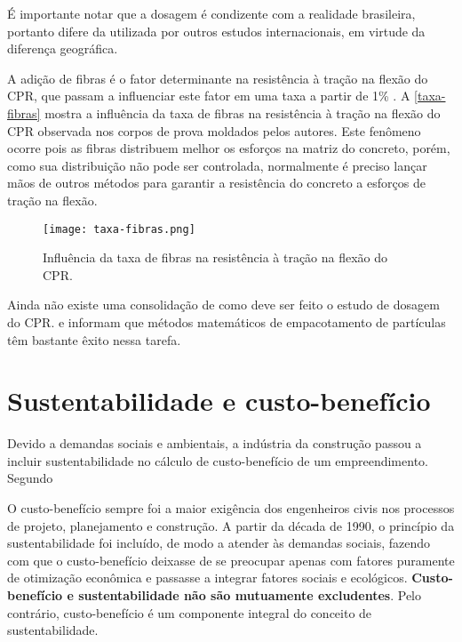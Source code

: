 É importante notar que a dosagem  é condizente com a realidade brasileira, portanto difere da utilizada por outros estudos internacionais, em virtude da diferença geográfica.

A adição de fibras é o fator determinante na resistência à tração na flexão do CPR, que passam a influenciar este fator em uma taxa a partir de 1\% \cite[p.~138]{Vanderlei_e_Giongo}. A \autoref{taxa-fibras} mostra a influência da taxa de fibras na resistência à tração na flexão do CPR observada nos corpos de prova moldados pelos autores. Este fenômeno ocorre pois as fibras distribuem melhor os esforços na matriz do concreto, porém, como sua distribuição não pode ser controlada, normalmente é preciso lançar mãos de outros métodos para garantir a resistência do concreto a esforços de tração na flexão.

\begin{figure}[htb]
	\caption{\label{taxa-fibras}Influência da taxa de fibras na resistência à tração na flexão do CPR.}
	\begin{center}
	    \texttt{[image: taxa-fibras.png]}
	\end{center}
\end{figure}

Ainda não existe uma consolidação de como deve ser feito o estudo de dosagem do CPR.  e  informam que métodos matemáticos de empacotamento de partículas têm bastante êxito nessa tarefa.

\section{Sustentabilidade e custo-benefício}

Devido a demandas sociais e ambientais, a indústria da construção passou a incluir sustentabilidade no cálculo de custo-benefício de um empreendimento. Segundo 

\begin{citacao}
O custo-benefício sempre foi a maior exigência dos engenheiros civis nos processos de projeto, planejamento e construção. A partir da década de 1990, o princípio da sustentabilidade foi incluído, de modo a atender às demandas sociais, fazendo com que o custo-benefício deixasse de se preocupar apenas com fatores puramente de otimização econômica e passasse a integrar fatores sociais e ecológicos. \textbf{Custo-benefício e sustentabilidade não são mutuamente excludentes}. Pelo contrário, custo-benefício é um componente integral do conceito de sustentabilidade.
\end{citacao}

